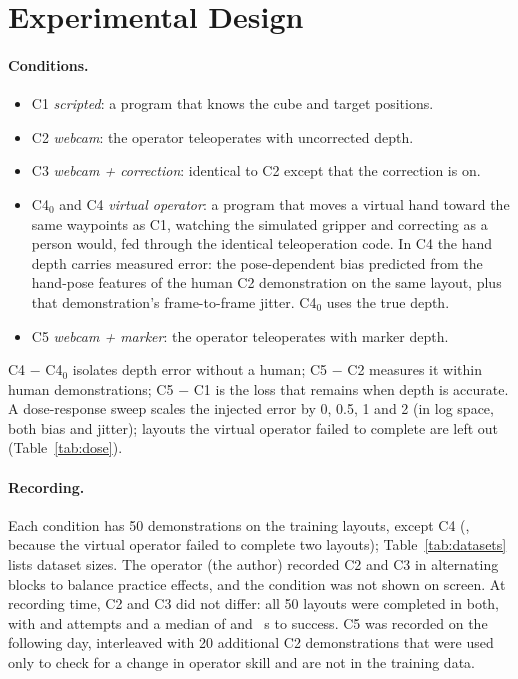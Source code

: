 \documentclass[10pt]{article}
\newcommand{\condI}{C1}
\newcommand{\condII}{C2}
\newcommand{\condIII}{C3}
\newcommand{\condIV}{C4}
\newcommand{\condVz}{C4$_0$}
\newcommand{\condV}{C5}
\begin{document}
\section{Experimental Design}

\paragraph{Conditions.}
\begin{itemize}
\item \condI{} \emph{scripted}: a program that knows the cube and target positions.
\item \condII{} \emph{webcam}: the operator teleoperates with uncorrected depth.
\item \condIII{} \emph{webcam + correction}: identical to \condII{} except that the correction is on.
\item \condVz{} and \condIV{} \emph{virtual operator}: a program that moves a virtual hand toward the same waypoints as \condI{}, watching the simulated gripper and correcting as a person would, fed through the identical teleoperation code.
In \condIV{} the hand depth carries measured error: the pose-dependent bias predicted from the hand-pose features of the human \condII{} demonstration on the same layout, plus that demonstration's frame-to-frame jitter. \condVz{} uses the true depth.
\item \condV{} \emph{webcam + marker}: the operator teleoperates with marker depth.
\end{itemize}
\condIV{} $-$ \condVz{} isolates depth error without a human; \condV{} $-$ \condII{} measures it within human demonstrations; \condV{} $-$ \condI{} is the loss that remains when depth is accurate.
A dose-response sweep scales the injected error by 0, 0.5, 1 and 2 (in log space, both bias and jitter); layouts the virtual operator failed to complete are left out (Table~\ref{tab:dose}).

\paragraph{Recording.}
Each condition has 50 demonstrations on the training layouts, except \condIV{} (\demosCFour{}, because the virtual operator failed to complete two layouts); Table~\ref{tab:datasets} lists dataset sizes.
The operator (the author) recorded \condII{} and \condIII{} in alternating blocks to balance practice effects, and the condition was not shown on screen.
At recording time, \condII{} and \condIII{} did not differ: all 50 layouts were completed in both, with \recPlaceTwoTries{} and \recPlaceThreeTries{} attempts and a median of \recPlaceTwoMed{} and \recPlaceThreeMed{}~s to success.
\condV{} was recorded on the following day, interleaved with 20 additional \condII{} demonstrations that were used only to check for a change in operator skill and are not in the training data.
\end{document}
